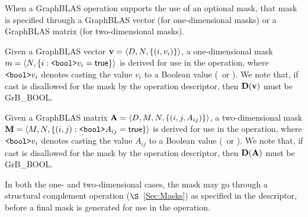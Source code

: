 When a GraphBLAS operation supports the use of an optional mask, that mask is
specified through a GraphBLAS vector (for one-dimensional masks) or
a GraphBLAS matrix (for two-dimensional masks).

Given a GraphBLAS vector ${\bf v} = \langle D,N, \{ (i,v_i) \} \rangle$, a
one-dimensional mask $m = \langle N, \{ i : \mbox{\tt <bool>}v_i = {\sf true} \} \rangle$
is derived for use in the operation, where $\mbox{\tt <bool>}v_i$ denotes
casting the value $v_i$ to a Boolean value (\true\ or \false).
We note that, if cast is disallowed for the mask by the operation descriptor, then
$\bold{D}({\bf v})$ must be {\sf GrB\_BOOL}.

Given a GraphBLAS matrix ${\bf A} = \langle D, M, N, \{ (i,j,A_{ij}) \} \rangle$,
a two-dimensional mask ${\bf M} = \langle M,N, \{ (i,j) : \mbox{\tt <bool>}A_{ij} = {\sf true} \} \rangle$
is derived for use in the operation, where $\mbox{\tt <bool>}v_i$ denotes
casting the value $A_{ij}$ to a Boolean value (\true\ or \false).
We note that, if cast is disallowed for the mask by the operation descriptor, then
$\bold{D}({\bf A})$ must be {\sf GrB\_BOOL}.

In both the one- and two-dimensional cases, the mask may go through a structural
complement operation ($\S$~\ref{Sec:Masks}) as specified in the descriptor, before a final
mask is generated for use in the operation.